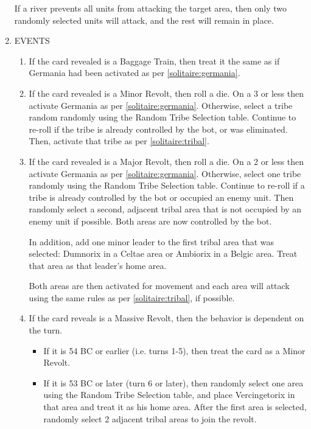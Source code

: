 \begin{enumerate}
  If a river prevents all units from attacking the target area, then only two randomly selected units will attack, and the rest will remain in place.

  \item EVENTS
  \begin{enumerate}[leftmargin=0in]
    \item If the card revealed is a Baggage Train, then treat it the same as if Germania had been activated as per \ref{solitaire:germania}.
    
    \item If the card revealed is a Minor Revolt, then roll a die. On a 3 or less then activate Germania as per \ref{solitaire:germania}. Otherwise, select a tribe random randomly using the Random Tribe Selection table. Continue to re-roll if the tribe is already controlled by the bot, or was eliminated. Then, activate that tribe as per \ref{solitaire:tribal}.
  
    \item If the card revealed is a Major Revolt, then roll a die. On a 2 or less then activate Germania as per \ref{solitaire:germania}. Otherwise, select one tribe randomly using the Random Tribe Selection table. Continue to re-roll if a tribe is already controlled by the bot or occupied an enemy unit. Then randomly select a second, adjacent tribal area that is not occupied by an enemy unit if possible. Both areas are now controlled by the bot.
  
    In addition, add one minor leader to the first tribal area that was selected: Dumnorix in a Celtae area or Ambiorix in a Belgic area. Treat that area as that leader's home area.
  
    Both areas are then activated for movement and each area will attack using the same rules as per \ref{solitaire:tribal}, if possible.
  
    \item If the card reveals is a Massive Revolt, then the behavior is dependent on the turn.
    \begin{itemize}
      \item If it is 54 BC or earlier (i.e. turns 1-5), then treat the card as a Minor Revolt.
      \item If it is 53 BC or later (turn 6 or later), then randomly select one area using the Random Tribe Selection table, and place Vercingetorix in that area and treat it as his home area. After the first area is selected, randomly select 2 adjacent tribal areas to join the revolt.
    \end{itemize}
  \end{enumerate}
  

\end{enumerate}
